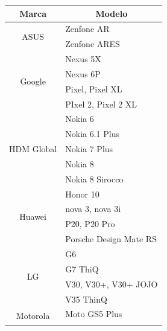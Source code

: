 \begin{table}[]
	\begin{tabular}{|c|l|}
		\hline
		\textbf{Marca}              & \multicolumn{1}{c|}{\textbf{Modelo}}               \\ \hline
		\multirow{2}{*}{ASUS}       & Zenfone AR                                         \\ \cline{2-2} 
		& Zenfone ARES                                       \\ \hline
		\multirow{4}{*}{Google}     & Nexus 5X                                           \\ \cline{2-2} 
		& Nexus 6P                                           \\ \cline{2-2} 
		& Pixel, Pixel XL                                    \\ \cline{2-2} 
		& PIxel 2, Pixel 2 XL                                \\ \hline
		\multirow{5}{*}{HDM Global} & Nokia 6                                            \\ \cline{2-2} 
		& Nokia 6.1 Plus                                     \\ \cline{2-2} 
		& Nokia 7 Plus                                       \\ \cline{2-2} 
		& Nokia 8                                            \\ \cline{2-2} 
		& Nokia 8 Sirocco                                    \\ \hline
		\multirow{4}{*}{Huawei}     & Honor 10                                           \\ \cline{2-2} 
		& nova 3, nova 3i                                    \\ \cline{2-2} 
		& P20, P20 Pro                                       \\ \cline{2-2} 
		& Porsche Design Mate RS                             \\ \hline
		\multirow{4}{*}{LG}         & G6                                                 \\ \cline{2-2} 
		& G7 ThiQ                                            \\ \cline{2-2} 
		& V30, V30+, V30+ JOJO                               \\ \cline{2-2} 
		& V35 ThinQ                                          \\ \hline
		\multirow{7}{*}{Motorola}   & Moto GS5 Plus                                      \\ \cline{2-2} 

\end{tabular}
\end{table}
